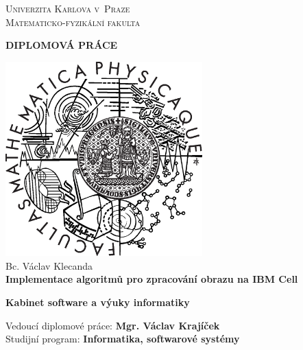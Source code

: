 \begin{center}


\large
\textsc{
Univerzita Karlova v~Praze\\
Matematicko-fyzikální fakulta\\[1.2cm]
}


\Huge
\textbf{
DIPLOMOVÁ PRÁCE\\[1.5cm]
}


\includegraphics[height=7.5cm]{data/logo}\\[2cm]


\Large
Bc. Václav Klecanda\\[1cm]

\LARGE
\textbf{
Implementace algoritmů pro zpracování obrazu na IBM Cell\\[1cm]
}


\large
\textbf{
Kabinet software a výuky informatiky\\
}

Vedoucí diplomové práce: \textbf{Mgr. Václav Krajíček}\\

Studijní program: \textbf{Informatika, softwarové systémy}

\end{center}

\pagebreak

